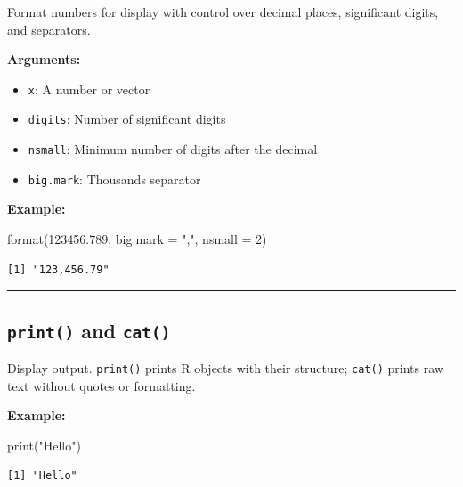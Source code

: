 \documentclass[
  letterpaper,
  DIV=11,
  numbers=noendperiod]{scrreprt}
\newenvironment{Shaded}{\begin{snugshade}}{\end{snugshade}}
\newcommand{\AttributeTok}[1]{\textcolor[rgb]{0.40,0.45,0.13}{#1}}
\newcommand{\DecValTok}[1]{\textcolor[rgb]{0.68,0.00,0.00}{#1}}
\newcommand{\FloatTok}[1]{\textcolor[rgb]{0.68,0.00,0.00}{#1}}
\newcommand{\FunctionTok}[1]{\textcolor[rgb]{0.28,0.35,0.67}{#1}}
\newcommand{\NormalTok}[1]{\textcolor[rgb]{0.00,0.23,0.31}{#1}}
\newcommand{\StringTok}[1]{\textcolor[rgb]{0.13,0.47,0.30}{#1}}
\providecommand{\tightlist}{%
  \setlength{\itemsep}{0pt}\setlength{\parskip}{0pt}}
\begin{document}
Format numbers for display with control over decimal places, significant
digits, and separators.

\textbf{Arguments:}

\begin{itemize}
\tightlist
\item
  \texttt{x}: A number or vector
\item
  \texttt{digits}: Number of significant digits
\item
  \texttt{nsmall}: Minimum number of digits after the decimal
\item
  \texttt{big.mark}: Thousands separator
\end{itemize}

\textbf{Example:}

\begin{Shaded}
\begin{Highlighting}[]
\FunctionTok{format}\NormalTok{(}\FloatTok{123456.789}\NormalTok{, }\AttributeTok{big.mark =} \StringTok{","}\NormalTok{, }\AttributeTok{nsmall =} \DecValTok{2}\NormalTok{)}
\end{Highlighting}
\end{Shaded}

\begin{verbatim}
[1] "123,456.79"
\end{verbatim}

\begin{center}\rule{0.5\linewidth}{0.5pt}\end{center}

\subsection{\texorpdfstring{\texttt{print()} and
\texttt{cat()}}{print() and cat()}}\label{print-and-cat}

Display output. \texttt{print()} prints R objects with their structure;
\texttt{cat()} prints raw text without quotes or formatting.

\textbf{Example:}

\begin{Shaded}
\begin{Highlighting}[]
\FunctionTok{print}\NormalTok{(}\StringTok{"Hello"}\NormalTok{)}
\end{Highlighting}
\end{Shaded}

\begin{verbatim}
[1] "Hello"
\end{verbatim}
\end{document}
